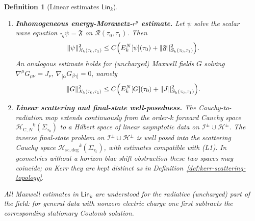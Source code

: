 \documentclass[10pt,a4paper]{amsart}
\newtheorem{definition}{Definition}
\newcommand{\Hcauchy}{\mathcal H_{\mathrm{C},N}}
\newcommand{\Hscatt}{\mathcal H_{\mathrm{sc,deg}}}
\newcommand{\Lin}{\mathsf{Lin}}
\begin{document}
\begin{definition}[Linear estimates $\Lin_{k}$]
\begin{enumerate}
\item[(L1)] \textbf{Inhomogeneous energy-Morawetz-$r^{p}$ estimate.}
Let $\psi$ solve the scalar wave equation $\square_{g}\psi=\mathfrak{F}$ on $\mathcal{R}(\tau_{0},\tau_{1})$.
Then
\begin{equation}\label{eq:Lin-abstract}
\|\psi\|_{\mathcal X_{k}(\tau_{0},\tau_{1})}^{2}
\le
C\Bigl(E^{N}_{k}[\psi](\tau_{0})
+\|\mathfrak{F}\|_{\mathcal S_{k}(\tau_{0},\tau_{1})}^{2}\Bigr).
\end{equation}
An analogous estimate holds for (uncharged) Maxwell fields $G$ solving
$\nabla^{\mu}G_{\mu\nu}=J_{\nu}$, $\nabla_{[\alpha}G_{\beta\gamma]}=0$, namely
\begin{equation}
\|G\|_{\mathcal X_{k}(\tau_{0},\tau_{1})}^{2}
\le
C\Bigl(E^{N}_{k}[G](\tau_{0})
+\|J\|_{\mathcal S_{k}(\tau_{0},\tau_{1})}^{2}\Bigr).
\end{equation}

\item[(L2)] \textbf{Linear scattering and final-state well-posedness.}
The Cauchy-to-radiation map extends continuously from the order-$k$ forward Cauchy space ${\Hcauchy}^{k}(\Sigma_{\tau_0})$ to a Hilbert space of linear asymptotic data on $\mathcal I^{\pm}\cup\mathcal H^{\pm}$. The inverse final-state problem on $\mathcal I^{\pm}\cup\mathcal H^{\pm}$ is well posed into the scattering Cauchy space ${\Hscatt}^{k}(\Sigma_{\tau_0})$, with estimates compatible with (L1). In geometries without a horizon blue-shift obstruction these two spaces may coincide; on Kerr they are kept distinct as in Definition~\ref{def:kerr-scattering-topology}.
\end{enumerate}

All Maxwell estimates in $\Lin_{k}$ are understood for the \emph{radiative} (uncharged) part of the field:
for general data with nonzero electric charge one first subtracts the corresponding stationary Coulomb solution.
\end{definition}
\end{document}
